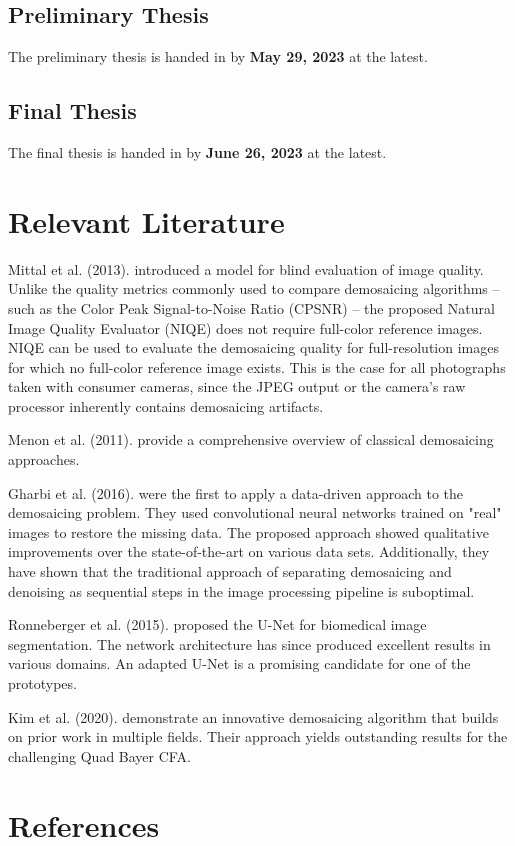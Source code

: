 \documentclass[english,notitlepage,smartquotes]{hgbreport}
\begin{document}
\subsection{Preliminary Thesis}

The preliminary thesis is handed in by \textbf{May 29, 2023} at the latest.

\subsection{Final Thesis}

The final thesis is handed in by \textbf{June 26, 2023} at the latest.

\section{Relevant Literature}

Mittal et al. (2013). \cite{Mittal2013} introduced a model for blind evaluation of image quality. Unlike the quality metrics commonly used to compare demosaicing algorithms -- such as the Color Peak Signal-to-Noise Ratio (CPSNR) \cite{Menon2011} -- the proposed Natural Image Quality Evaluator (NIQE) does not require full-color reference images. NIQE can be used to evaluate the demosaicing quality for full-resolution images for which no full-color reference image exists. This is the case for all photographs taken with consumer cameras, since the JPEG output or the camera's raw processor inherently contains demosaicing artifacts.

Menon et al. (2011). \cite{Menon2011} provide a comprehensive overview of classical demosaicing approaches.

Gharbi et al. (2016). \cite{Gharbi2016} were the first to apply a data-driven approach to the demosaicing problem. They used convolutional neural networks trained on "real" images to restore the missing data. The proposed approach showed qualitative improvements over the state-of-the-art on various data sets. Additionally, they have shown that the traditional approach of separating demosaicing and denoising as sequential steps in the image processing pipeline is suboptimal.

Ronneberger et al. (2015). \cite{Ronneberger2015} proposed the U-Net for biomedical image segmentation. The network architecture has since produced excellent results in various domains. An adapted U-Net is a promising candidate for one of the prototypes.

Kim et al. (2020). \cite{Kim2020} demonstrate an innovative demosaicing algorithm that builds on prior work in multiple fields. Their approach yields outstanding results for the challenging Quad Bayer CFA.
  
\section*{References}

\printbibliography[heading=noheader]

\end{document}
